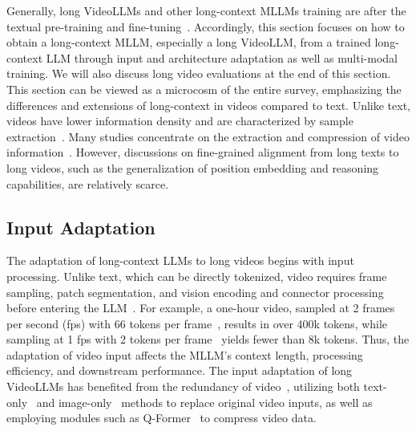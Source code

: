 Generally, long VideoLLMs and other long-context MLLMs training are after the textual pre-training and fine-tuning~\citep{liu2024world,zhang2406long}. Accordingly, this section focuses on how to obtain a long-context MLLM, especially a long VideoLLM, from a trained long-context LLM through input and architecture adaptation as well as multi-modal training. We will also discuss long video evaluations at the end of this section. This section can be viewed as a microcosm of the entire survey, emphasizing the differences and extensions of long-context in videos compared to text. Unlike text, videos have lower information density and are characterized by sample extraction~\citep{zou2024seconds}. Many studies concentrate on the extraction and compression of video information~\citep{song2024moviechat,ren2024timechat,qianmomentor,yu2024frame}. However, discussions on fine-grained alignment from long texts to long videos, such as the generalization of position embedding\citep{kexuefm10040,wang2024qwen2} and reasoning capabilities\citep{li2024temporal}, are relatively scarce.

\subsection{Input Adaptation}\label{sec10_1} 

The adaptation of long-context LLMs to long videos begins with input processing. Unlike text, which can be directly tokenized, video requires frame sampling, patch segmentation, and vision encoding and connector processing before entering the LLM~\citep{zou2024seconds}. For example, a one-hour video, sampled at 2 frames per second (fps) with 66 tokens per frame~\citep{wang2024qwen2}, results in over 400k tokens, while sampling at 1 fps with 2 tokens per frame~\citep{li2025llama} yields fewer than 8k tokens. Thus, the adaptation of video input affects the MLLM's context length, processing efficiency, and downstream performance. The input adaptation of long VideoLLMs has benefited from the redundancy of video~\citep{zou2024seconds}, utilizing both text-only~\citep{zhang2023simple} and image-only~\citep{kim2024image,zhang2406long} methods to replace original video inputs, as well as employing modules such as Q-Former~\citep{li2023blip,ma2023vista} to compress video data.

